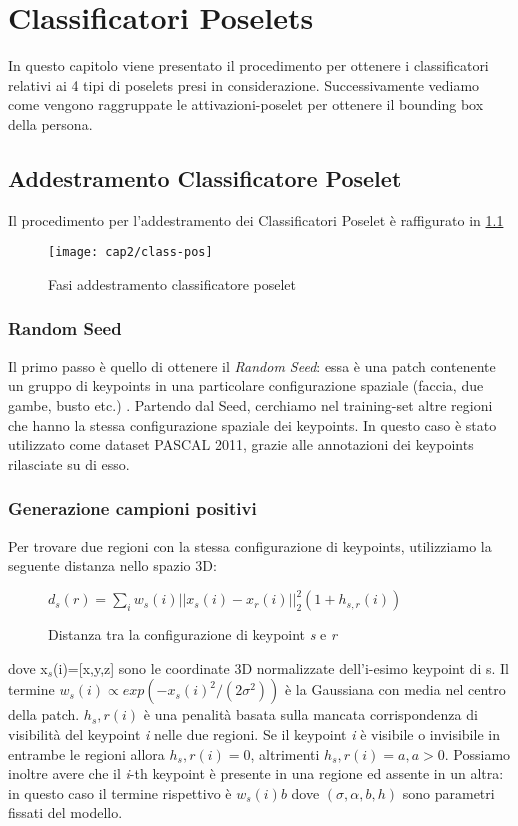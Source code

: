 \chapter{Classificatori Poselets} \label{cap2}
In questo capitolo viene presentato il procedimento per ottenere i classificatori relativi ai 4 tipi di poselets presi in considerazione. Successivamente vediamo come vengono raggruppate le attivazioni-poselet per ottenere il bounding box della persona.

\section{Addestramento Classificatore Poselet}
Il procedimento per l'addestramento dei Classificatori Poselet è raffigurato in \ref{class-pos}

\begin{figure}[h]
\centering
\texttt{[image: cap2/class-pos]}
\caption{Fasi addestramento classificatore poselet}
\label{class-pos}
\end{figure}

\subsection{Random Seed}
Il primo passo è quello di ottenere il \textit{Random Seed}: essa è una patch contenente un gruppo di keypoints in una particolare configurazione spaziale (faccia, due gambe, busto etc.) . Partendo dal Seed, cerchiamo nel training-set altre regioni che hanno la stessa configurazione spaziale dei keypoints. In questo caso è stato utilizzato come dataset PASCAL 2011\cite{pascal2011}, grazie alle annotazioni dei keypoints rilasciate su di esso\cite{pascal-keypoints}.\\

\subsection{Generazione campioni positivi}
Per trovare due regioni con la stessa configurazione di keypoints, utilizziamo la seguente distanza nello spazio 3D:

\begin{figure}[h]
\centering
  $d_s(r)=\sum_{i}w_s(i)||x_s(i)-x_r(i)||_2^2(1+h_{s,r}(i))$
  \caption{Distanza tra la configurazione di keypoint \textit{s} e \textit{r}}
\end{figure}

dove x$_s$(i)=[x,y,z] sono le coordinate 3D normalizzate dell'i-esimo keypoint di s. Il termine $w_s(i)\propto exp(-x_s(i)^2/(2\sigma ^2))$ è la Gaussiana con media nel centro della patch. $h_s,r(i)$ è una penalità basata sulla mancata corrispondenza di visibilità del keypoint \textit{i} nelle due regioni. Se il keypoint \textit{i} è visibile o invisibile in entrambe le regioni allora $h_s,r(i)=0$, altrimenti $h_s,r(i)=a, a>0$. Possiamo inoltre avere che il \textit{i}-th keypoint è presente in una regione ed assente in un altra: in questo caso il termine rispettivo è $w_s(i)b$ dove $(\sigma,\alpha,b,h)$ sono parametri fissati del modello.\\

